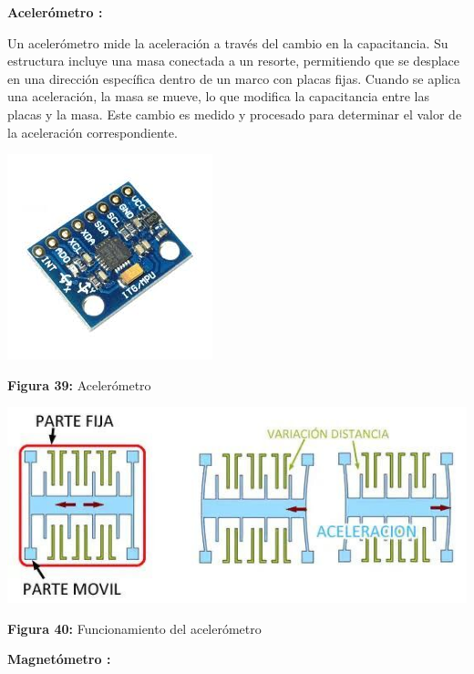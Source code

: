 \vspace{10mm}
\textbf{Acelerómetro :}

Un acelerómetro mide la aceleración a través del cambio en la capacitancia. Su estructura incluye una masa conectada a un resorte, permitiendo que se desplace en una dirección específica dentro de un marco con placas fijas. Cuando se aplica una aceleración, la masa se mueve, lo que modifica la capacitancia entre las placas y la masa. Este cambio es medido y procesado para determinar el valor de la aceleración correspondiente.


\vspace{5mm}

\begin{center}
	\includegraphics[width=0.2\linewidth, height=0.2\textheight]{img/acelerometro}
	
	\vspace{2mm} %
	
	\textbf{Figura 39:} Acelerómetro
\end{center}

\vspace{5mm} %

\begin{center}
	\includegraphics[width=0.6\linewidth]{img/Sacelerometro}
	
	\vspace{2mm} %
	
	\textbf{Figura 40:} Funcionamiento del acelerómetro
\end{center}



\vspace{10mm}
\textbf{Magnetómetro :}

